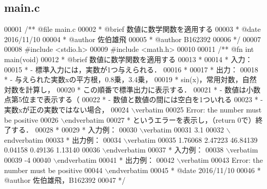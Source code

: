 \subsection{main.\-c}

\begin{DoxyCode}
00001 \textcolor{comment}{/**  @file main.c}
00002 \textcolor{comment}{ *   @brief  数値に数学関数を適用する}
00003 \textcolor{comment}{ *   @date   2016/11/10}
00004 \textcolor{comment}{ *   @author 佐伯雄飛}
00005 \textcolor{comment}{ *   @author B162392}
00006 \textcolor{comment}{ */}
00007 
00008 \textcolor{preprocessor}{#include <stdio.h>}
00009 \textcolor{preprocessor}{#include <math.h>}
00010 \textcolor{comment}{}
00011 \textcolor{comment}{/** @fn int main(void)}
00012 \textcolor{comment}{ *  @brief  数値に数学関数を適用する}
00013 \textcolor{comment}{ *}
00014 \textcolor{comment}{ *  入力：}
00015 \textcolor{comment}{ *  - 標準入力には，実数が1つ与えられる．}
00016 \textcolor{comment}{ *}
00017 \textcolor{comment}{ *  出力：}
00018 \textcolor{comment}{ *  - 与えられた実数xの平方根，0.8乗，3.4乗，}
00019 \textcolor{comment}{ *    sin(x)，常用対数，自然対数を計算し，}
00020 \textcolor{comment}{ *    この順番で標準出力に表示する．}
00021 \textcolor{comment}{ *  - 数値は小数点第5位まで表示する（%
00022 \textcolor{comment}{ *  - 数値と数値の間には空白を1ついれる}
00023 \textcolor{comment}{ *  - 実数xが正の実数ではない場合，}
00024 \textcolor{comment}{\(\backslash\)verbatim}
00025 \textcolor{comment}{Error: the number must be positive}
00026 \textcolor{comment}{\(\backslash\)endverbatim}
00027 \textcolor{comment}{ *    というエラーを表示し，（return 0で）終了する．}
00028 \textcolor{comment}{ *}
00029 \textcolor{comment}{ *  入力例：}
00030 \textcolor{comment}{\(\backslash\)verbatim}
00031 \textcolor{comment}{3.1}
00032 \textcolor{comment}{\(\backslash\)endverbatim}
00033 \textcolor{comment}{  *  出力例：}
00034 \textcolor{comment}{\(\backslash\)verbatim}
00035 \textcolor{comment}{1.76068 2.47223 46.84139 0.04158 0.49136 1.13140}
00036 \textcolor{comment}{\(\backslash\)endverbatim}
00037 \textcolor{comment}{  *  入力例：}
00038 \textcolor{comment}{\(\backslash\)verbatim}
00039 \textcolor{comment}{-4}
00040 \textcolor{comment}{\(\backslash\)endverbatim}
00041 \textcolor{comment}{  *  出力例：}
00042 \textcolor{comment}{\(\backslash\)verbatim}
00043 \textcolor{comment}{Error: the number must be positive}
00044 \textcolor{comment}{\(\backslash\)endverbatim}
00045 \textcolor{comment}{ *  @date   2016/11/10}
00046 \textcolor{comment}{ *  @author 佐伯雄飛，B162392}
00047 \textcolor{comment}{ */}
}
\end{DoxyCode}

